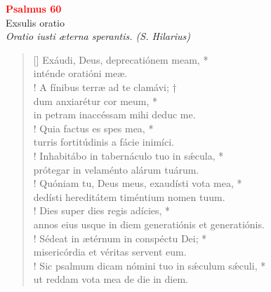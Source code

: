 


\def\greinitialformat#1{%
{\fontsize{39}{39}\selectfont #1}%
}




\vspace{0.3cm}
\begin{center}
 \textcolor{red}{\large \bf Psalmus 60}\\
Exsulis oratio\\
\textit{\small Oratio iusti æterna sperantis. (S. Hilarius)}
\end{center}
\begin{verse}[\versewidth]
Exáudi, Deus, deprecatiónem meam, *\\
inténde oratióni meæ.\\!
\vin A fínibus terræ ad te clamávi; †\\
\vin dum anxiarétur cor meum, *\\
\vin in petram inaccéssam mihi deduc me.\\!
Quia factus es spes mea, *\\
turris fortitúdinis a fácie inimíci.\\!
\vin Inhabitábo in tabernáculo tuo in s\'{æ}cula, *\\
\vin prótegar in velaménto alárum tuárum.\\!
Quóniam tu, Deus meus, exaudísti vota mea, *\\
dedísti hereditátem timéntium nomen tuum.\\!
\vin Dies super dies regis adícies, *\\
\vin annos eius usque in diem generatiónis et generatiónis.\\!
Sédeat in ætérnum in conspéctu Dei; *\\
misericórdia et véritas servent eum.\\!
\vin Sic psalmum dicam nómini tuo in s\'{æ}culum s\'{æ}culi, *\\
\vin ut reddam vota mea de die in diem.\\
\end{verse}
\vspace{1cm}


